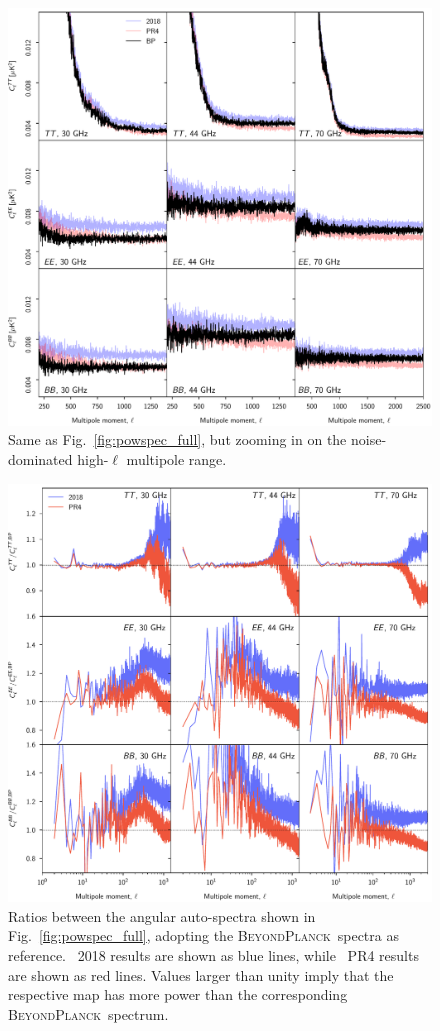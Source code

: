 \documentclass[twocolumn]{aa}
\newcommand{\BP}{\textsc{BeyondPlanck}}
\begin{document}
\begin{figure}[t]
  \center
  \includegraphics[width=\linewidth]{figs/cls_bp_npipe_dpc_zoom_BP10.pdf}
  \caption{Same as Fig.~\ref{fig:powspec_full}, but zooming in on the noise-dominated high-$\ell$ multipole range.}\label{fig:powspec_full_zoom}
\end{figure}

\begin{figure}[t]
  \center
  \includegraphics[width=\linewidth]{figs/cls_bp_npipe_dpc_ratio_BP10.pdf}
  \caption{Ratios between the angular auto-spectra shown in
    Fig.~\ref{fig:powspec_full}, adopting the \BP\ spectra as reference.
    \Planck\ 2018 results are shown as blue lines, while \Planck\ PR4 results are
    shown as red lines. Values larger than unity imply that the respective map
    has more power than the corresponding \BP\ spectrum.}
\label{fig:powspec_ratio} 
\end{figure}
\end{document}
